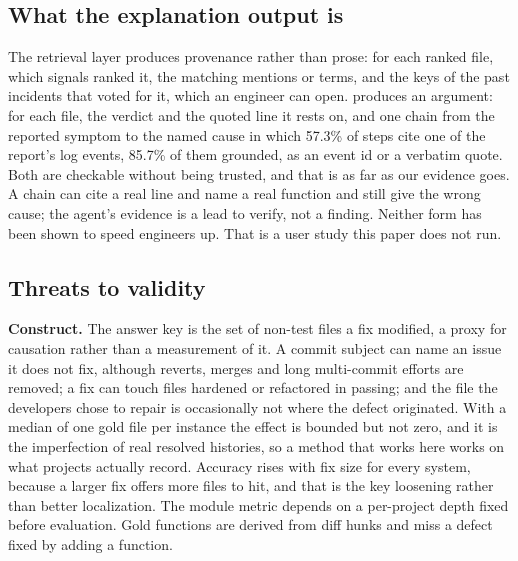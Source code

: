 \subsection{What the explanation output is}
\label{sec:discussion:explanation}

The retrieval layer produces provenance rather than prose: for each
ranked file, which signals ranked it, the matching mentions or terms,
and the keys of the past incidents that voted for it, which an engineer
can open. \sys{} produces an argument: for each file, the verdict and
the quoted line it rests on, and one chain from the reported symptom to
the named cause in which 57.3\% of steps cite one of the report's log
events, 85.7\% of them grounded, as an event id or a verbatim quote.
Both are checkable without being
trusted, and that is as far as our evidence goes. A chain can cite a
real line and name a real function and still give the wrong cause; the
agent's evidence is a lead to verify, not a finding. Neither form has
been shown to speed engineers up. That is a user study this paper does
not run.

\subsection{Threats to validity}
\label{sec:discussion:threats}

\textbf{Construct.} The answer key is the set of non-test files a fix
modified, a proxy for causation rather than a measurement of it. A
commit subject can name an issue it does not fix, although reverts,
merges and long multi-commit efforts are removed; a fix can touch files
hardened or refactored in passing; and the file the developers chose
to repair is occasionally not where the defect originated. With a
median of one gold file per instance the effect is bounded but not
zero, and it is the imperfection of real resolved histories, so a
method that works here works on what projects actually record.
Accuracy rises with fix size for every system, because a larger fix
offers more files to hit, and that is the key loosening rather than
better localization. The module metric depends on a per-project depth
fixed before evaluation. Gold functions are derived from diff hunks and
miss a defect fixed by adding a function.

